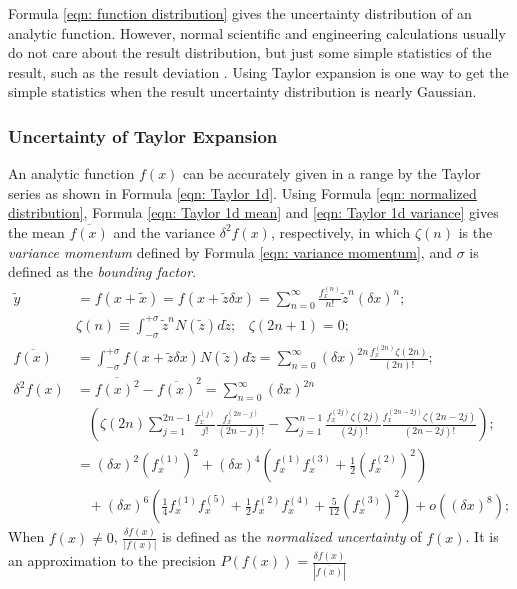 \documentclass[twoside]{article}
\numberwithin{equation}{section}
\newcommand{\eqspace}{\;\;\;}
\begin{document}
\fi


Formula \eqref{eqn: function distribution} gives the uncertainty distribution of an analytic function.
However, normal scientific and engineering calculations usually do not care about the result distribution, but just some simple statistics of the result, such as the result deviation \cite{Statistical_Methods} \cite{Precisions_Physical_Measurements}.
Using Taylor expansion is one way to get the simple statistics when the result uncertainty distribution is nearly Gaussian.

\subsubsection{Uncertainty of Taylor Expansion}

An analytic function $f(x)$ can be accurately given in a range by the Taylor series as shown in Formula \eqref{eqn: Taylor 1d}.
Using Formula \eqref{eqn: normalized distribution}, Formula \eqref{eqn: Taylor 1d mean} and \eqref{eqn: Taylor 1d variance} \cite{Prev_Precision_Arithmetic} gives the mean $\overline{f(x)}$ and the variance $\delta^2 f(x)$, respectively, in which $\zeta(n)$ is the \emph{variance momentum} defined by Formula \eqref{eqn: variance momentum}, and $\sigma$ is defined as the \emph{bounding factor}.
\begin{align}
\label{eqn: Taylor 1d} 
\tilde{y} &= f(x + \tilde{x}) = f(x + \tilde{z} \delta x) = \sum_{n=0}^{\infty} \frac{f^{(n)}_x}{n!} \tilde{z}^n (\delta x)^n; \\
\label{eqn: variance momentum}
& \zeta(n) \equiv \int_{-\sigma}^{+\sigma} \tilde{z}^n N(\tilde{z}) d \tilde{z};\eqspace \zeta(2n+1) = 0; \\
\label{eqn: Taylor 1d mean}
\overline{f(x)} &= \int_{-\sigma}^{+\sigma} f(x + \tilde{z} \delta x) N(\tilde{z}) d \tilde{z}
  = \sum_{n=0}^{\infty}(\delta x)^{2n} \frac{f^{(2n)}_x \zeta(2n)}{(2n)!}; \\
\delta^2 f(x) &= \overline{f(x)^2} - \overline{f(x)}^2 = \sum_{n=0}^{\infty} (\delta x)^{2n}  \nonumber \\
\label{eqn: Taylor 1d variance}
&\eqspace \left( \zeta(2n) \sum_{j=1}^{2n-1} \frac{f^{(j)}_x}{j!} \frac{f^{(2n-j)}_x}{(2n-j)!} - 
 	\sum_{j=1}^{n-1} \frac{f^{(2j)}_x \zeta(2j)}{(2j)!} \frac{f^{(2n-2j)}_x \zeta(2n - 2j)}{(2n-2j)!} \right); \\
  &= (\delta x)^2 (f^{(1)}_x)^2 + (\delta x)^4 \left(f^{(1)}_x f^{(3)}_x + \frac{1}{2} (f^{(2)}_x)^2 \right) \nonumber \\
  &\eqspace + (\delta x)^6 \left(\frac{1}{4} f^{(1)}_x f^{(5)}_x + \frac{1}{2} f^{(2)}_x f^{(4)}_x + \frac{5}{12} (f^{(3)}_x)^2 \right) + o((\delta x)^8);
\end{align}
When $f(x) \neq 0$, $\frac{\delta f(x)}{|f(x)|}$ is defined as the \emph{normalized uncertainty} of $f(x)$.  
It is an approximation to the precision $P(f(x)) =\frac{\delta f(x)}{|\overline{f(x)}|}$
\end{document}
